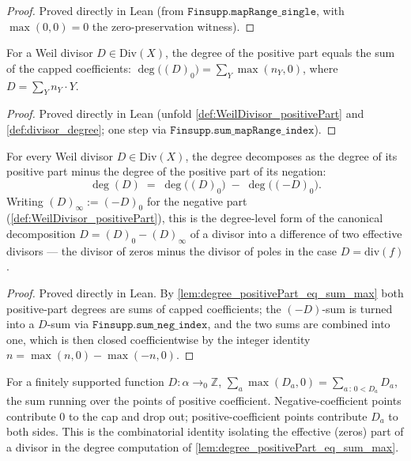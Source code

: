 \begin{proof}
  Proved directly in Lean (from \(\texttt{Finsupp.mapRange\_single}\), with
  \(\max(0, 0) = 0\) the zero-preservation witness).
\end{proof}
\begin{lemma}

  \label{lem:degree_positivePart_eq_sum_max}
  For a Weil divisor \(D \in \mathrm{Div}(X)\), the degree of the positive part
  equals the sum of the capped coefficients:
  \(\deg\bigl((D)_0\bigr) = \sum_Y \max(n_Y, 0)\), where \(D = \sum_Y n_Y \cdot Y\).
\end{lemma}
\begin{proof}
  Proved directly in Lean (unfold \ref{def:WeilDivisor_positivePart} and
  \ref{def:divisor_degree}; one step via \(\texttt{Finsupp.sum\_mapRange\_index}\)).
\end{proof}
\begin{lemma}

  \label{lem:degree_eq_degree_positivePart_sub}
  For every Weil divisor \(D \in \mathrm{Div}(X)\), the degree decomposes as the
  degree of its positive part minus the degree of the positive part of its
  negation:
  \[
    \deg(D) \;=\; \deg\bigl((D)_0\bigr) \;-\; \deg\bigl((-D)_0\bigr).
  \]
  Writing \((D)_\infty := (-D)_0\) for the negative part
  (\ref{def:WeilDivisor_positivePart}), this is the degree-level form of the
  canonical decomposition \(D = (D)_0 - (D)_\infty\) of a divisor into a
  difference of two effective divisors --- the divisor of zeros minus the
  divisor of poles in the case \(D = \mathrm{div}(f)\).
\end{lemma}
\begin{proof}
  Proved directly in Lean. By \ref{lem:degree_positivePart_eq_sum_max} both
  positive-part degrees are sums of capped coefficients; the
  \((-D)\)-sum is turned into a \(D\)-sum via \(\texttt{Finsupp.sum\_neg\_index}\),
  and the two sums are combined into one, which is then closed coefficientwise
  by the integer identity \(n = \max(n,0) - \max(-n,0)\).
\end{proof}
\begin{lemma}
  \label{lem:finsupp_sum_max_zero_eq_sum_filter_pos}
  For a finitely supported function \(D \colon \alpha \to_0 \mathbb Z\),
  \(\sum_a \max(D_a, 0) = \sum_{a \,:\, 0 < D_a} D_a\), the sum running over
  the points of positive coefficient. Negative-coefficient points contribute
  \(0\) to the cap and drop out; positive-coefficient points contribute
  \(D_a\) to both sides. This is the combinatorial identity isolating the
  effective (zeros) part of a divisor in the degree computation of
  \ref{lem:degree_positivePart_eq_sum_max}.
\end{lemma}
